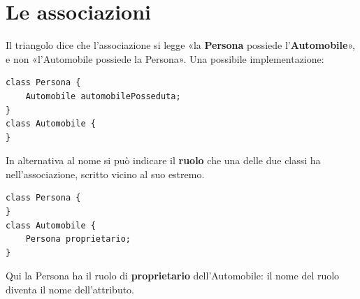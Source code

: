 \section{Le associazioni}


\begin{center}
\end{center}

Il triangolo dice che l'associazione si legge «la \textbf{Persona} possiede l'\textbf{Automobile}», e non «l'Automobile possiede
la Persona». Una possibile implementazione:

\begin{lstlisting}[style=java]
class Persona {
    Automobile automobilePosseduta;
}
class Automobile {
}
\end{lstlisting}

In alternativa al nome si può indicare il \textbf{ruolo} che una delle due classi ha nell'associazione, scritto vicino al suo estremo.

\noindent\begin{minipage}[c]{0.48\textwidth}
\centering
{}
\end{minipage}\hfill
\begin{minipage}[c]{0.48\textwidth}
\begin{lstlisting}[style=java]
class Persona {
}
class Automobile {
    Persona proprietario;
}
\end{lstlisting}
\end{minipage}

\medskip
Qui la Persona ha il ruolo di \textbf{proprietario} dell'Automobile: il nome del ruolo diventa il nome dell'attributo.

